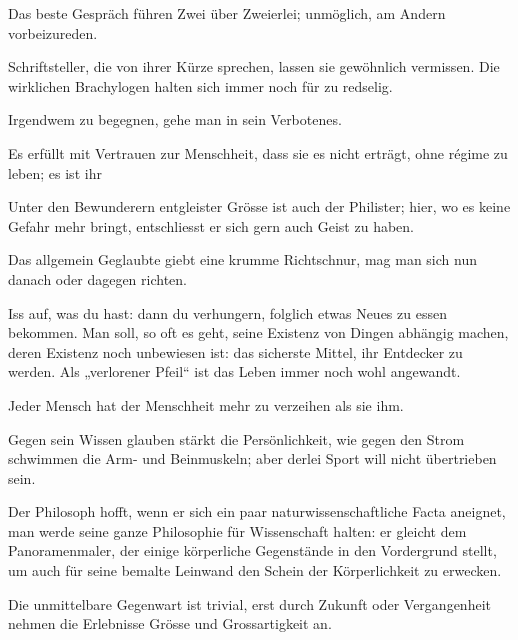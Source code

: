 Das beste Gespräch führen Zwei über Zweierlei; unmöglich,  am Andern vorbeizureden.
\par

Schriftsteller, die von ihrer Kürze sprechen, lassen sie gewöhnlich vermissen. Die wirklichen Brachylogen halten sich immer noch für zu redselig.
\par

Irgendwem zu begegnen, gehe man in sein Verbotenes.
\par

Es erfüllt mit Vertrauen zur Menschheit, dass sie es nicht erträgt, ohne régime zu leben; es ist ihr 
\par

Unter den Bewunderern entgleister Grösse ist auch der Philister; hier, wo es keine Gefahr mehr bringt, entschliesst er sich gern auch Geist zu haben.
\par

Das allgemein Geglaubte giebt eine krumme Richtschnur, mag man sich nun danach oder dagegen richten.
\par

Iss auf, was du hast: dann  du verhungern,  folglich etwas Neues zu essen bekommen. Man soll, so oft es geht, seine Existenz von Dingen abhängig machen, deren Existenz noch unbewiesen ist: das sicherste Mittel, ihr Entdecker zu werden. Als „verlorener Pfeil“ ist das Leben immer noch wohl angewandt.
\par

Jeder Mensch hat der Menschheit mehr zu verzeihen als sie ihm.
\par

Gegen sein Wissen glauben stärkt die Persönlichkeit, wie gegen den Strom schwimmen die Arm- und Beinmuskeln; aber derlei Sport will nicht übertrieben sein.
\par

Der Philosoph hofft, wenn er sich ein paar naturwissenschaftliche Facta aneignet, man werde seine ganze Philosophie für Wissenschaft halten: er gleicht dem Panoramenmaler, der einige körperliche Gegenstände in den Vordergrund stellt, um auch für seine bemalte Leinwand den Schein der Körperlichkeit zu erwecken.
\par

Die unmittelbare Gegenwart ist trivial, erst durch Zukunft oder Vergangenheit nehmen die Erlebnisse Grösse und Grossartigkeit an.
\par

